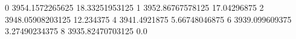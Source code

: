 0 3954.1572265625 18.33251953125
1 3952.86767578125 17.04296875
2 3948.05908203125 12.234375
4 3941.4921875 5.66748046875
6 3939.099609375 3.27490234375
8 3935.82470703125 0.0
